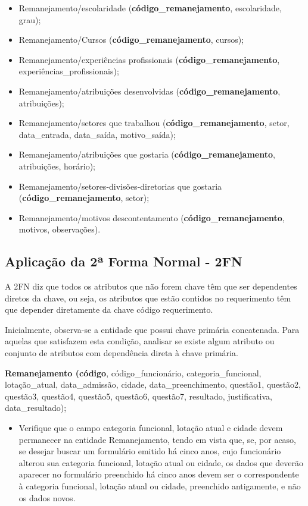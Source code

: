 \documentclass{article}
\begin{document}
\begin{itemize}
    \item Remanejamento/escolaridade (\textbf{código\_remanejamento}, escolaridade, grau);
    \item Remanejamento/Cursos (\textbf{código\_remanejamento}, cursos);
    \item Remanejamento/experiências profissionais (\textbf{código\_remanejamento}, experiências\_profissionais);
    \item Remanejamento/atribuições desenvolvidas (\textbf{código\_remanejamento}, atribuições);
    \item Remanejamento/setores que trabalhou (\textbf{código\_remanejamento}, setor, data\_entrada, data\_saída, motivo\_saída); 
    \item Remanejamento/atribuições que gostaria (\textbf{código\_remanejamento}, atribuições, horário);
    \item Remanejamento/setores-divisões-diretorias que gostaria (\textbf{código\_remanejamento}, setor);
    \item Remanejamento/motivos descontentamento (\textbf{código\_remanejamento}, motivos, observações).
\end{itemize}

\subsection{Aplicação da 2ª Forma Normal - 2FN}
A 2FN diz que todos os atributos que não forem chave têm que ser dependentes diretos da chave, ou seja, os atributos que estão contidos no requerimento têm que depender diretamente da chave código requerimento.

Inicialmente, observa-se a entidade que possui chave primária concatenada. Para aquelas que satisfazem esta condição, analisar se existe algum atributo ou conjunto de atributos com dependência direta à chave primária.

\textbf{Remanejamento (código}, código\_funcionário, categoria\_funcional, lotação\_atual, data\_admissão, cidade, data\_preenchimento, questão1, questão2, questão3, questão4, questão5, questão6, questão7, resultado, justificativa, data\_resultado);
\begin{itemize}[label=--]
    \item Verifique que o campo categoria funcional, lotação atual e cidade devem permanecer na entidade Remanejamento, tendo em vista que, se, por acaso, se desejar buscar um formulário emitido há cinco anos, cujo funcionário alterou sua categoria funcional, lotação atual ou cidade, os dados que deverão aparecer no formulário preenchido há cinco anos devem ser o correspondente à categoria funcional, lotação atual ou cidade, preenchido antigamente, e não os dados novos.
\end{itemize}
\end{document}
